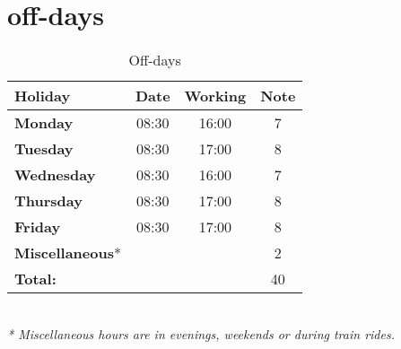 \section{off-days}
\begin{table} [h!]
	\begin{tabular}{l|ccc}
		\textbf{Holiday} 	&	Date 		&	Working	&	Note \\
		\hline
		\textbf{Monday} 		&	08:30	&	16:00	& 7 \\
		\rowcolor{Gray}
		\textbf{Tuesday} 	&	08:30 	&	17:00	& 8 \\
		\textbf{Wednesday} 	&	08:30	&	16:00	& 7 \\
		\rowcolor{Gray}
		\textbf{Thursday}	&	08:30	&	17:00	& 8 \\
		\textbf{Friday}		&	08:30	&	17:00	& 8 \\
		\rowcolor{Gray}
		\textbf{Miscellaneous}* & 		& 			& 2 \\
		\hline
		\textbf{Total:} 	&			&			& 40\\
	\end{tabular} \\
	\textit{* Miscellaneous hours are in evenings, weekends or during train rides.}
	\caption{Off-days}
	\label{tab:offdays}
\end{table}
